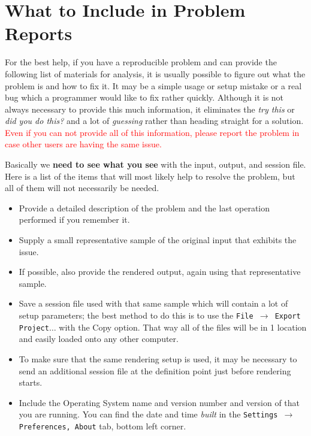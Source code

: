 \section{What to Include in Problem Reports}%
\label{sub:include_in_problem_reports}
For the best help, if you have a reproducible problem and can provide the following list of materials for analysis, it
is usually possible to figure out what the problem is and how to fix it. It may be a simple usage or setup mistake or
a real bug which a programmer would like to fix rather quickly. Although it is not always necessary to provide this
much information, it eliminates the \textit{try this} or \textit{did you do this?} and a lot of \textit{guessing} rather than heading straight for a solution. \textcolor{red}{Even if you can not provide all of this information, please report the problem in case other users are having the same issue.}

Basically we\textbf{ need to see what you see }with the input, output, and session file. Here is a list of the items that will most likely help to resolve the problem, but all of them will not necessarily be needed.

\begin{itemize}[nosep]
	\item Provide a detailed description of the problem and the last operation performed if you remember it.
	\item Supply a small representative sample of the original input that exhibits the issue.
	\item If possible, also provide the rendered output, again using that representative sample.
	\item Save a session file used with that same sample which will contain a lot of setup parameters; the best method to do this is to use the \texttt{File $\rightarrow$ Export Project}$\dots$ with the Copy option. That way all of the files will be in 1 location and easily loaded onto any other computer.
	\item To make sure that the same rendering setup is used, it may be necessary to send an additional session file at the definition point just before rendering starts.
	\item Include the Operating System name and version number and version of \CGG{} that you are running. You can find the date and time \textit{built} in the \texttt{Settings $\rightarrow$ Preferences, About} tab, bottom left corner.
\end{itemize} 


